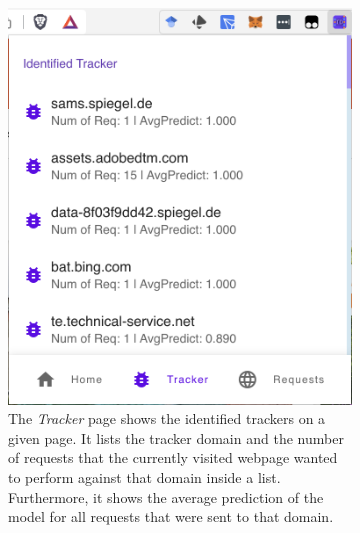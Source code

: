 \begin{figure}[ht!]
\begin{subfigure}[b]{.30\textwidth}
      \includegraphics[width=\linewidth, keepaspectratio]{images/Tracker.png}
      \caption{The \emph{Tracker} page shows the identified trackers on a given page. It lists the tracker domain and 
      the number of requests that the currently visited webpage wanted to perform against that domain inside a list. Furthermore, it shows
    the average prediction of the model for all requests that were sent to that domain.}
      \label{fig:Tracker}
  \end{subfigure}
  \hfill
  \begin{subfigure}[b]{.30\textwidth}
      \centering

\end{subfigure}
\end{figure}
